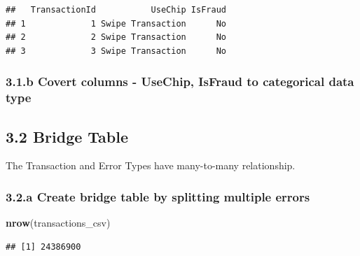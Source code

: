 \documentclass[
]{article}
\newenvironment{Shaded}{\begin{snugshade}}{\end{snugshade}}
\newcommand{\AttributeTok}[1]{\textcolor[rgb]{0.13,0.29,0.53}{#1}}
\newcommand{\CommentTok}[1]{\textcolor[rgb]{0.56,0.35,0.01}{\textit{#1}}}
\newcommand{\FunctionTok}[1]{\textcolor[rgb]{0.13,0.29,0.53}{\textbf{#1}}}
\newcommand{\NormalTok}[1]{#1}
\newcommand{\OtherTok}[1]{\textcolor[rgb]{0.56,0.35,0.01}{#1}}
\newcommand{\SpecialCharTok}[1]{\textcolor[rgb]{0.81,0.36,0.00}{\textbf{#1}}}
\newcommand{\StringTok}[1]{\textcolor[rgb]{0.31,0.60,0.02}{#1}}
\begin{document}
\begin{verbatim}
##   TransactionId           UseChip IsFraud
## 1             1 Swipe Transaction      No
## 2             2 Swipe Transaction      No
## 3             3 Swipe Transaction      No
\end{verbatim}

\subsubsection{3.1.b Covert columns - UseChip, IsFraud to categorical
data
type}\label{b-covert-columns---usechip-isfraud-to-categorical-data-type}

\begin{Shaded}
\end{Shaded}

\subsection{3.2 Bridge Table}\label{bridge-table}

The Transaction and Error Types have many-to-many relationship.

\subsubsection{3.2.a Create bridge table by splitting multiple
errors}\label{a-create-bridge-table-by-splitting-multiple-errors}

\begin{Shaded}
\begin{Highlighting}[]
\FunctionTok{nrow}\NormalTok{(transactions\_csv)}
\end{Highlighting}
\end{Shaded}

\begin{verbatim}
## [1] 24386900
\end{verbatim}

\begin{Shaded}
\end{Shaded}
\end{document}
